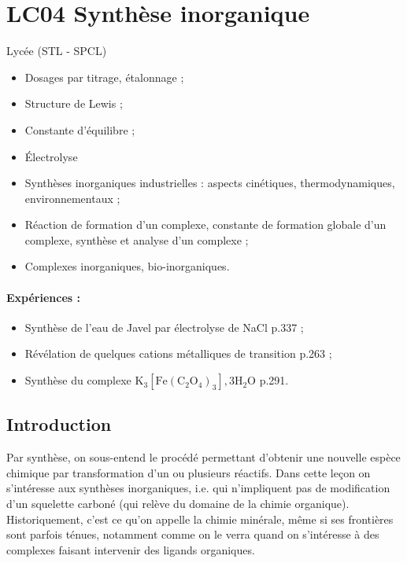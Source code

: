 \section{LC04 Synthèse inorganique}

\niveau Lycée (STL - SPCL)

\prerequis
\begin{itemize}
\item Dosages par titrage, étalonnage ;
\item Structure de Lewis ;
\item Constante d'équilibre ;
\item Électrolyse
\end{itemize}

\objectif
\begin{itemize}
\item Synthèses inorganiques industrielles : aspects cinétiques, thermodynamiques, environnementaux ;
\item Réaction de formation d'un complexe, constante de formation globale d'un complexe, synthèse et analyse d'un complexe ;
\item Complexes inorganiques, bio-inorganiques.
\end{itemize}

\footnotesize{}

\paragraph{Expériences :}
\begin{itemize}
\item Synthèse de l'eau de Javel par électrolyse de NaCl \cite{Cachau-Hereillat2011} p.337 ;
\item Révélation de quelques cations métalliques de transition \cite{Buchere2017} p.263 ;
\item Synthèse du complexe $\mathrm{K_3[Fe(C_2O_4)_3],3H_2O}$ \cite{Buchere2017} p.291.
\end{itemize}


\subsection{Introduction}

Par synthèse, on sous-entend le procédé permettant d'obtenir une nouvelle espèce chimique par transformation d'un ou plusieurs réactifs. 
Dans cette leçon on s'intéresse aux synthèses inorganiques, i.e. qui n'impliquent pas de modification d'un squelette carboné (qui relève du domaine de la chimie organique).
Historiquement, c'est ce qu'on appelle la chimie minérale, même si ses frontières sont parfois ténues, notamment comme on le verra quand on s'intéresse à des complexes faisant intervenir des ligands organiques.

